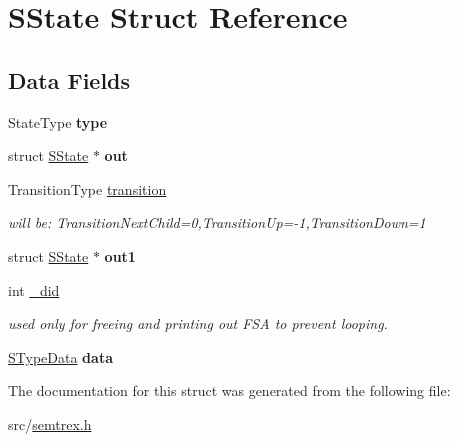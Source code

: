 \hypertarget{structSState}{\section{S\+State Struct Reference}
\label{structSState}
}
\subsection*{Data Fields}
\begin{DoxyCompactItemize}
\item 
\hypertarget{structSState_ac570e1a6012a5f5e9ac09e2b7a261a3c}{State\+Type {\bfseries type}}\label{structSState_ac570e1a6012a5f5e9ac09e2b7a261a3c}

\item 
\hypertarget{structSState_abe374b3ee42ca3ece234fcaafd4f8330}{struct \hyperlink{structSState}{S\+State} $\ast$ {\bfseries out}}\label{structSState_abe374b3ee42ca3ece234fcaafd4f8330}

\item 
\hypertarget{structSState_a929d501094346c34a5c14e715b2f133f}{Transition\+Type \hyperlink{structSState_a929d501094346c34a5c14e715b2f133f}{transition}}\label{structSState_a929d501094346c34a5c14e715b2f133f}

\begin{DoxyCompactList}\small\item\em will be\+: Transition\+Next\+Child=0,Transition\+Up=-\/1,Transition\+Down=1 \end{DoxyCompactList}\item 
\hypertarget{structSState_a6dc01f4330db9f0d04ede6c97d8b1e77}{struct \hyperlink{structSState}{S\+State} $\ast$ {\bfseries out1}}\label{structSState_a6dc01f4330db9f0d04ede6c97d8b1e77}

\item 
\hypertarget{structSState_ae22ac0f7bb019ad6aae9714be4828a8e}{int \hyperlink{structSState_ae22ac0f7bb019ad6aae9714be4828a8e}{\+\_\+did}}\label{structSState_ae22ac0f7bb019ad6aae9714be4828a8e}

\begin{DoxyCompactList}\small\item\em used only for freeing and printing out F\+S\+A to prevent looping. \end{DoxyCompactList}\item 
\hypertarget{structSState_a4b8ede6710c740ee449445a77fc2d988}{\hyperlink{unionSTypeData}{S\+Type\+Data} {\bfseries data}}\label{structSState_a4b8ede6710c740ee449445a77fc2d988}

\end{DoxyCompactItemize}


The documentation for this struct was generated from the following file\+:\begin{DoxyCompactItemize}
\item 
src/\hyperlink{semtrex_8h}{semtrex.\+h}\end{DoxyCompactItemize}
